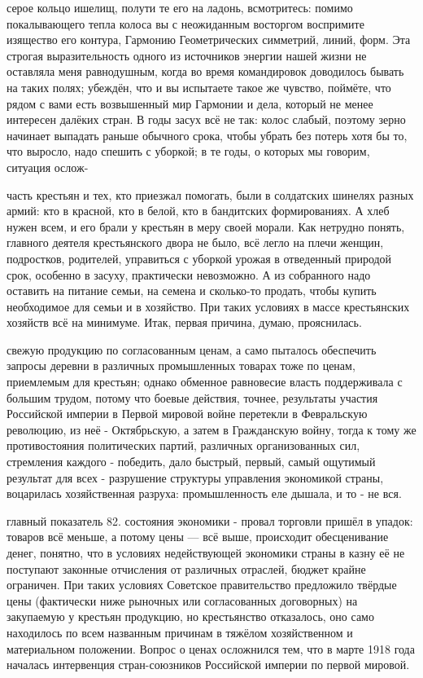 \label{079-1}
серое кольцо ишелищ, полути те его на ладонь, всмотритесь: помимо покалывающего тепла колоса вы с неожиданным восторгом воспримите изящество его контура, Гармонию Геометрических симметрий, линий, форм. Эта строгая выразительность одного из источников энергии нашей жизни не оставляла меня равнодушным, когда во время командировок доводилось бывать на таких полях; убеждён, что и вы испытаете такое же чувство, поймёте, что рядом с вами есть возвышенный мир Гармонии и дела, который не менее интересен далёких стран. В годы засух всё не так: колос слабый, поэтому зерно начинает выпадать раньше обычного срока, чтобы убрать без потерь хотя бы то, что выросло, надо спешить с уборкой; в те годы, о которых мы говорим, ситуация ослож-

\label{080-1}
часть крестьян и тех, кто приезжал помогать, были в солдатских шинелях разных армий: кто в красной, кто в белой, кто в бандитских формированиях. А хлеб нужен всем, и его брали у крестьян в меру своей морали. Как нетрудно понять, главного деятеля крестьянского двора не было, всё легло на плечи женщин, подростков, родителей, управиться с уборкой урожая в отведенный природой срок, особенно в засуху, практически невозможно. А из собранного надо оставить на питание семьи, на семена и сколько-то продать, чтобы купить необходимое для семьи и в хозяйство. При таких условиях в массе крестьянских хозяйств всё на минимуме. Итак, первая причина, думаю, прояснилась.

\label{081-1}
свежую продукцию по согласованным ценам, а само пыталось обеспечить запросы деревни в различных промышленных товарах тоже по ценам, приемлемым для крестьян; однако обменное равновесие власть поддерживала с большим трудом, потому что боевые действия, точнее, результаты участия Российской империи в Первой мировой войне перетекли в Февральскую революцию, из неё - Октябрьскую, а затем в Гражданскую войну, тогда к тому же противостояния политических партий, различных организованных сил, стремления каждого - победить, дало быстрый, первый, самый ощутимый результат для всех - разрушение структуры управления экономикой страны, воцарилась хозяйственная разруха: промышленность еле дышала, и то - не вся.

\label{082-1}
главный показатель 82. состояния экономики - провал торговли пришёл в упадок: товаров всё меньше, а потому цены — всё выше, происходит обесценивание денег, понятно, что в условиях недействующей экономики страны в казну её не поступают законные отчисления от различных отраслей, бюджет крайне ограничен. При таких условиях Советское правительство предложило твёрдые цены (фактически ниже рыночных или согласованных договорных) на закупаемую у крестьян продукцию, но крестьянство отказалось, оно само находилось по всем названным причинам в тяжёлом хозяйственном и материальном положении. Вопрос о ценах осложнился тем, что в марте 1918 года началась интервенция стран-союзников Российской империи по первой мировой.


